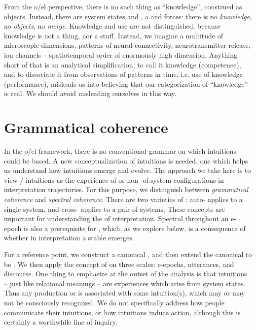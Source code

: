   From the o/el perspective, there is no such thing as “knowledge”, construed as objects. Instead, there are system states and , a  and forces: there is no \textit{knowledge}, no \textit{objects}, no \textit{merge}. Knowledge and use are not distinguished, because knowledge is not a thing, nor a stuff. Instead, we imagine a multitude of microscopic dimensions, patterns of neural connectivity, neurotransmitter release, ion channels -- spatiotemporal order of enormously high dimension. Anything short of that is an analytical simplification; to call it knowledge (competence), and to dissociate it from observations of patterns in time, i.e. use of knowledge (performance), misleads us into believing that our categorization of “knowledge” is real. We should avoid misleading ourselves in this way.

\section{Grammatical coherence}

In the o/el framework, there is no conventional grammar on which  intuitions could be based. A new conceptualization of intuitions is needed, one which helps us understand how intuitions emerge and evolve. The approach we take here is to view / intuitions as the experience of  or non- of system configurations in interpretation trajectories. For this purpose, we distinguish between \textit{grammatical coherence} and \textit{spectral coherence}. There are two varieties of : auto- applies to a single system, and cross- applies to a pair of systems. These concepts are important for understanding the  of interpretation. Spectral  throughout an e-epoch is also a prerequisite for , which, as we explore below, is a consequence of whether in interpretation a stable  emerges.

For a reference point, we construct a canonical , and then extend the canonical  to be . We then apply the concept of  on three scales: e-epochs, utterances, and discourse. One thing to emphasize at the outset of the analysis is that intuitions -- just like relational meanings -- are experiences which arise from system states. Thus any production or  is associated with some intuition(s), which may or may not be consciously recognized. We do not specifically address how people communicate their intuitions, or how intuitions induce action, although this is certainly a worthwhile line of inquiry.

